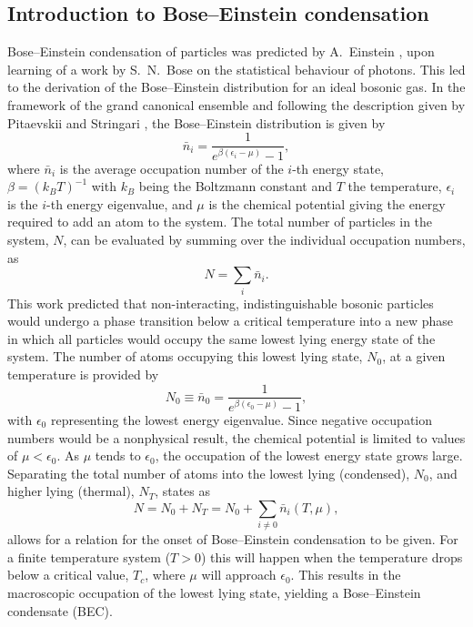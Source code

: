 \subsection{Introduction to Bose--Einstein condensation}\label{sub:becintro}
Bose--Einstein condensation of particles was predicted by A.~Einstein \cite{Einstein_bec_1925}, upon learning of a work by S.~N.~Bose on the statistical behaviour of photons. This led to the derivation of the Bose--Einstein distribution for an ideal bosonic gas. In the framework of the grand canonical ensemble and following the description given by Pitaevskii and Stringari \cite[chap. 2]{BK:Pitaevskii_Stringari_2003}, the Bose--Einstein distribution is given by
\begin{equation}
\bar{n}_i = \frac{1}{e^{\beta(\epsilon_i - \mu)} -1},
\end{equation}
where $\bar{n}_i$ is the average occupation number of the $i$-th energy state, $\beta=(k_BT)^{-1}$ with $k_B$ being the Boltzmann constant and $T$ the temperature, $\epsilon_i$ is the $i$-th energy eigenvalue, and $\mu$ is the chemical potential giving the energy required to add an atom to the system.
The total number of particles in the system, $N$, can be evaluated by summing over the individual occupation numbers, as
\begin{equation}
N=\displaystyle\sum_i \bar{n}_i.
\end{equation}
This work predicted that non-interacting, indistinguishable bosonic particles would undergo a phase transition below a critical temperature into a new phase in which all particles would occupy the same lowest lying energy state of the system. The number of atoms occupying this lowest lying state, $N_0$, at a given temperature is provided by
\begin{equation}
N_0 \equiv \bar{n}_0 = \frac{1}{e^{\beta(\epsilon_0 - \mu)} - 1},
\end{equation}
with $\epsilon_0$ representing the lowest energy eigenvalue. Since negative occupation numbers would be a nonphysical result, the chemical potential is limited to values of $\mu < \epsilon_0$. As $\mu$ tends to $\epsilon_0$, the occupation of the lowest energy state grows large. Separating the total number of atoms into the lowest lying (condensed), $N_0$, and higher lying (thermal), $N_T$, states as
\begin{equation}
N = N_0 + N_T = N_0 + \displaystyle\sum_{i\neq 0}\bar{n}_i(T,\mu),
\end{equation}
allows for a relation for the onset of Bose--Einstein condensation to be given. For a finite temperature system ($T>0$) this will happen when the temperature drops below a critical value, $T_c$, where $\mu$ will approach $\epsilon_0$. This results in the macroscopic occupation of the lowest lying state, yielding a Bose--Einstein condensate (BEC).

